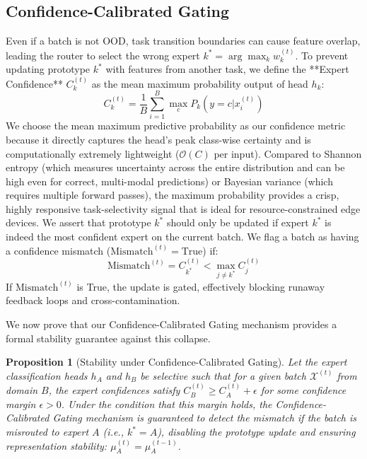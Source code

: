 \documentclass{article}
\theoremstyle{plain}
\newtheorem{proposition}[theorem]{Proposition}
\theoremstyle{definition}
\theoremstyle{remark}
\begin{document}
\subsection{Confidence-Calibrated Gating}
Even if a batch is not OOD, task transition boundaries can cause feature overlap, leading the router to select the wrong expert $k^* = \arg\max_k w_k^{(t)}$. To prevent updating prototype $k^*$ with features from another task, we define the **Expert Confidence** $C_k^{(t)}$ as the mean maximum probability output of head $h_k$:
\begin{equation}
    C_k^{(t)} = \frac{1}{B} \sum_{i=1}^B \max_c P_k(y=c | x_i^{(t)})
\end{equation}
We choose the mean maximum predictive probability as our confidence metric because it directly captures the head's peak class-wise certainty and is computationally extremely lightweight ($\mathcal{O}(C)$ per input). Compared to Shannon entropy (which measures uncertainty across the entire distribution and can be high even for correct, multi-modal predictions) or Bayesian variance (which requires multiple forward passes), the maximum probability provides a crisp, highly responsive task-selectivity signal that is ideal for resource-constrained edge devices. We assert that prototype $k^*$ should only be updated if expert $k^*$ is indeed the most confident expert on the current batch. We flag a batch as having a confidence mismatch ($\text{Mismatch}^{(t)} = \text{True}$) if:
\begin{equation}
    \text{Mismatch}^{(t)} = C_{k^*}^{(t)} < \max_{j \neq k^*} C_j^{(t)}
\end{equation}
If $\text{Mismatch}^{(t)}$ is True, the update is gated, effectively blocking runaway feedback loops and cross-contamination.

We now prove that our Confidence-Calibrated Gating mechanism provides a formal stability guarantee against this collapse.

\begin{proposition}[Stability under Confidence-Calibrated Gating]
Let the expert classification heads $h_A$ and $h_B$ be selective such that for a given batch $\mathcal{X}^{(t)}$ from domain $B$, the expert confidences satisfy $C_B^{(t)} \ge C_A^{(t)} + \epsilon$ for some confidence margin $\epsilon > 0$. Under the condition that this margin holds, the Confidence-Calibrated Gating mechanism is guaranteed to detect the mismatch if the batch is misrouted to expert $A$ (i.e., $k^* = A$), disabling the prototype update and ensuring representation stability: $\mu_A^{(t)} = \mu_A^{(t-1)}$.
\end{proposition}
\end{document}
